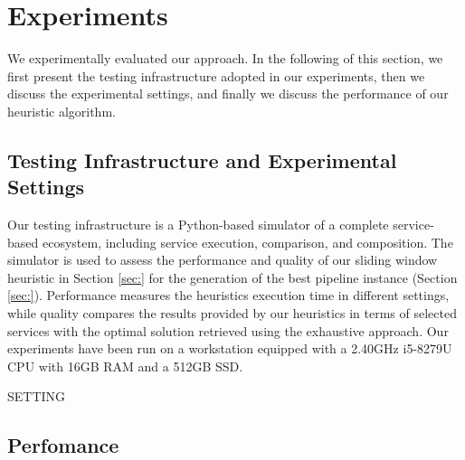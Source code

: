 \section{Experiments}\label{sec:experiment}



We experimentally evaluated our approach. In the following of this section, we first present the testing infrastructure adopted in our experiments,
then we discuss the experimental settings, and
finally we discuss the performance of our heuristic algorithm.

\subsection{Testing Infrastructure and Experimental Settings}
Our testing infrastructure is a Python-based simulator of a complete service-based ecosystem, including service execution, comparison, and composition. The simulator is used to assess the performance and quality of our sliding window heuristic in Section \ref{sec:} for the generation of the best pipeline instance (Section \ref{sec:}). Performance measures the heuristics execution time in different settings, while quality compares the results provided by our heuristics in terms of selected services with the optimal solution retrieved using the exhaustive approach.
Our experiments have been run on a workstation equipped with a 2.40GHz i5-8279U CPU with 16GB RAM and a 512GB SSD.

SETTING

\subsection{Perfomance}


